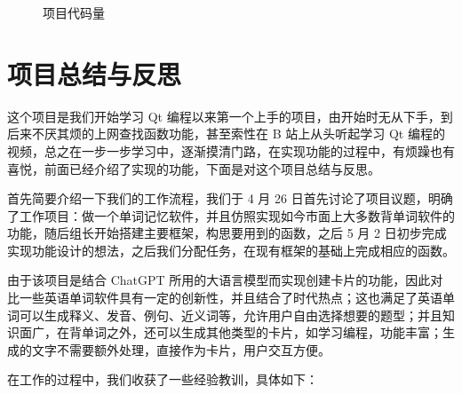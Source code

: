 \documentclass[12pt]{article}
\begin{document}
\begin{figure}[ht]
  \centering
  
  \caption{项目代码量}\label{fig:lines-chart}
\end{figure}

\section{项目总结与反思}

这个项目是我们开始学习 Qt 编程以来第一个上手的项目，由开始时无从下手，到后来不厌其烦的上网查找函数功能，甚至索性在 B 站上从头听起学习 Qt 编程的视频，总之在一步一步学习中，逐渐摸清门路，在实现功能的过程中，有烦躁也有喜悦，前面已经介绍了实现的功能，下面是对这个项目总结与反思。

首先简要介绍一下我们的工作流程，我们于 4 月 26 日首先讨论了项目议题，明确了工作项目：做一个单词记忆软件，并且仿照实现如今市面上大多数背单词软件的功能，随后组长开始搭建主要框架，构思要用到的函数，之后 5 月 2 日初步完成实现功能设计的想法，之后我们分配任务，在现有框架的基础上完成相应的函数。

由于该项目是结合 ChatGPT 所用的大语言模型而实现创建卡片的功能，因此对比一些英语单词软件具有一定的创新性，并且结合了时代热点；这也满足了英语单词可以生成释义、发音、例句、近义词等，允许用户自由选择想要的题型；并且知识面广，在背单词之外，还可以生成其他类型的卡片，如学习编程，功能丰富；生成的文字不需要额外处理，直接作为卡片，用户交互方便。

在工作的过程中，我们收获了一些经验教训，具体如下：
\end{document}
